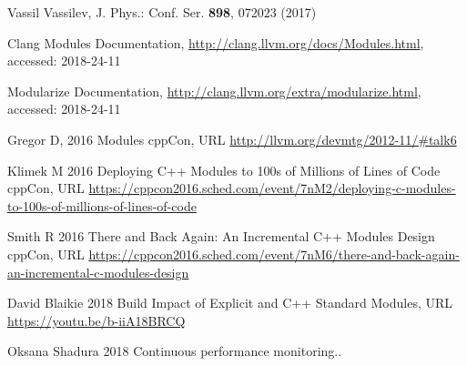 \documentclass{webofc}
\begin{document}
\begin{thebibliography}{}

Vassil Vassilev, J. Phys.: Conf. Ser. \textbf{898}, 072023 (2017)

Clang Modules Documentation, \url{http://clang.llvm.org/docs/Modules.html}, accessed: 2018-24-11

Modularize Documentation, \url{http://clang.llvm.org/extra/modularize.html}, accessed: 2018-24-11

Gregor D,   2016 Modules cppCon, URL \url{http://llvm.org/devmtg/2012-11/#talk6}

Klimek M 2016 Deploying C++ Modules to 100s of Millions of Lines of Code cppCon, URL \url{https://cppcon2016.sched.com/event/7nM2/deploying-c-modules-to-100s-of-millions-of-lines-of-code}

Smith R 2016 There and Back Again: An Incremental C++ Modules Design cppCon, URL \url{https://cppcon2016.sched.com/event/7nM6/there-and-back-again-an-incremental-c-modules-design}


David Blaikie 2018 Build Impact of Explicit and C++ Standard Modules, URL \url{https://youtu.be/b-iiA18BRCQ}

Oksana Shadura 2018 Continuous performance monitoring..


\end{thebibliography}
\end{document}
